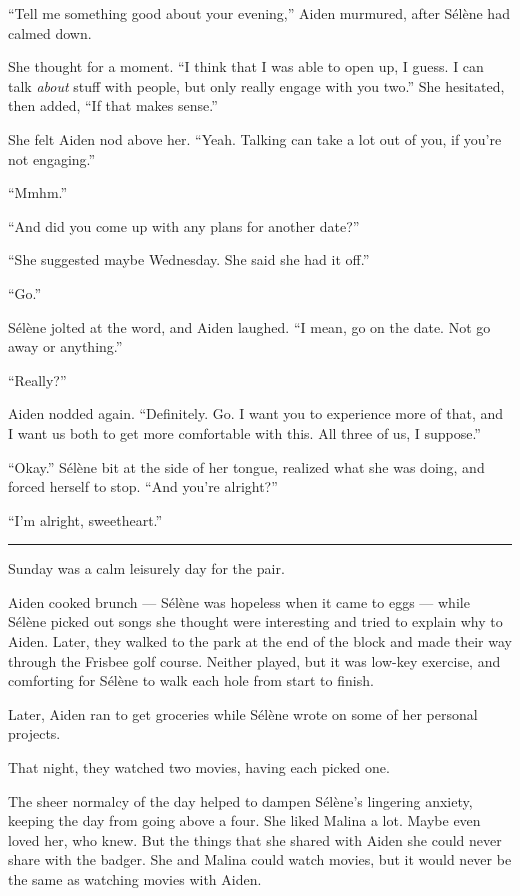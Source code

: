 ``Tell me something good about your evening,'' Aiden murmured, after Sélène had calmed down.

She thought for a moment. ``I think that I was able to open up, I guess. I can talk \emph{about} stuff with people, but only really engage with you two.'' She hesitated, then added, ``If that makes sense.''

She felt Aiden nod above her. ``Yeah. Talking can take a lot out of you, if you're not engaging.''

``Mmhm.''

``And did you come up with any plans for another date?''

``She suggested maybe Wednesday. She said she had it off.''

``Go.''

Sélène jolted at the word, and Aiden laughed. ``I mean, go on the date. Not go away or anything.''

``Really?''

Aiden nodded again. ``Definitely. Go. I want you to experience more of that, and I want us both to get more comfortable with this. All three of us, I suppose.''

``Okay.'' Sélène bit at the side of her tongue, realized what she was doing, and forced herself to stop. ``And you're alright?''

``I'm alright, sweetheart.''

\begin{center}\rule{0.5\linewidth}{\linethickness}\end{center}

Sunday was a calm leisurely day for the pair.

Aiden cooked brunch --- Sélène was hopeless when it came to eggs --- while Sélène picked out songs she thought were interesting and tried to explain why to Aiden. Later, they walked to the park at the end of the block and made their way through the Frisbee golf course. Neither played, but it was low-key exercise, and comforting for Sélène to walk each hole from start to finish.

Later, Aiden ran to get groceries while Sélène wrote on some of her personal projects.

That night, they watched two movies, having each picked one.

The sheer normalcy of the day helped to dampen Sélène's lingering anxiety, keeping the day from going above a four. She liked Malina a lot. Maybe even loved her, who knew. But the things that she shared with Aiden she could never share with the badger. She and Malina could watch movies, but it would never be the same as watching movies with Aiden.

